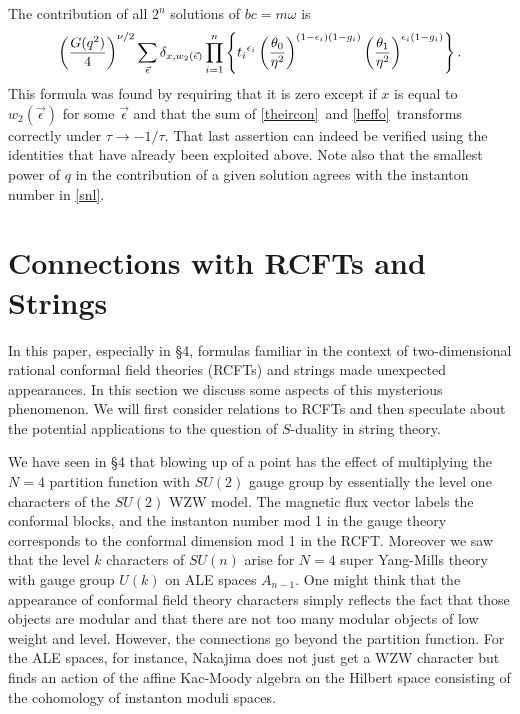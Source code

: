 \documentclass[12pt]{article}
\numberwithin{equation}{section}
\begin{document}
The contribution of all $2^n$
solutions of $bc=m\omega$ is
\begin{equation}
  \label{theircon}
  \left({G(q^2)\over 4}\right) ^{\nu/2}\sum_{\vec\epsilon}
  \delta_{x,w_2(\vec\epsilon)}\prod_{i=1}^n
  \left\{t_i{}^{\epsilon_i}\left(
    {\theta_0\over\eta^2}\right)^{(1-\epsilon_i)(1-g_i)}
  \left({\theta_1\over \eta^2}\right)^{\epsilon_i(1-g_i)}\right\}.
\end{equation}
This formula was found by requiring that it is zero except if
$x$ is equal to $w_2(\vec\epsilon)$ for some $\vec\epsilon$ and
that the sum of \eqref{theircon}\ and \eqref{heffo}\ transforms correctly under
$\tau\to-1/\tau$.
That last assertion can indeed be verified using
the identities that have already been exploited above.  Note also
that the smallest power of $q$ in the contribution of a given
solution agrees with the instanton number in \eqref{snl}.

\section{Connections with RCFTs and Strings}

In this paper, especially in  \S4, formulas familiar
in the context of two-dimensional rational conformal field
theories (RCFTs) and strings made unexpected appearances.
In this section we discuss some aspects
of this mysterious phenomenon. We will first consider relations
to RCFTs and then speculate about the potential applications
to the question of $S$-duality in string theory.

We have seen in  \S4 that blowing up of a point
has the effect of multiplying the $N=4$ partition function
with $SU(2)$ gauge group
by essentially the level one characters of the $SU(2)$
WZW model.  The magnetic flux vector
labels the conformal blocks, and the
instanton number mod 1 in the gauge theory
corresponds to the conformal dimension mod 1 in the RCFT.
Moreover we saw
that the level $k$ characters of $SU(n)$ arise
for $N=4$ super Yang-Mills theory with gauge group $U(k)$ on ALE
spaces $A_{n-1}$.
One might think that the appearance of conformal field theory characters
simply reflects the fact that those objects are modular and that there
are not too many modular objects of low weight and level.
However, the connections go beyond the partition function.
For the ALE spaces, for instance, Nakajima does not just get a WZW
character but finds an action of
the affine Kac-Moody algebra on the Hilbert space
consisting of the cohomology of instanton moduli spaces.
\end{document}
